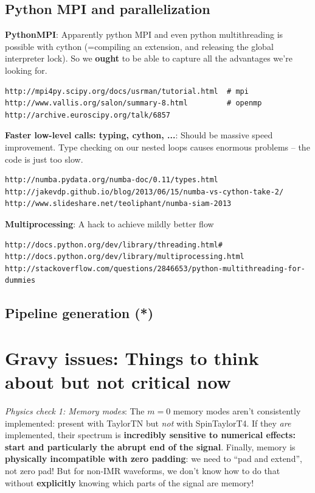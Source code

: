 \documentclass[twocolumn,prd,nofootinbib]{revtex4}
\begin{document}
\subsection{Python MPI and parallelization}

\noindent \textbf{PythonMPI}: Apparently python MPI and even python multithreading is possible with cython (=compiling an extension, and releasing the
global interpreter lock).  So we \textbf{ought} to be able to capture all the advantages we're looking for.
\begin{verbatim}
http://mpi4py.scipy.org/docs/usrman/tutorial.html  # mpi
http://www.vallis.org/salon/summary-8.html         # openmp
http://archive.euroscipy.org/talk/6857
\end{verbatim}

\noindent \textbf{Faster low-level calls: typing, cython, ...}: Should be massive speed improvement.  Type checking on
our nested loops causes enormous problems -- the code is just too slow.
\begin{verbatim}
http://numba.pydata.org/numba-doc/0.11/types.html
http://jakevdp.github.io/blog/2013/06/15/numba-vs-cython-take-2/
http://www.slideshare.net/teoliphant/numba-siam-2013
\end{verbatim}

\noindent \textbf{Multiprocessing}:  A hack to achieve mildly better flow
\begin{verbatim}
http://docs.python.org/dev/library/threading.html#	
http://docs.python.org/dev/library/multiprocessing.html
http://stackoverflow.com/questions/2846653/python-multithreading-for-dummies
\end{verbatim}

\subsection{Pipeline generation (*)}


\appendix



\section{Gravy issues: Things to think about but not critical now}

\emph{Physics check 1: Memory modes}: The $m=0$ memory modes \cite{2009PhRvD..80b4002F,2009ApJ...696L.159F,2010CQGra..27h4036F,2011PhRvD..84l4013F} aren't consistently implemented: present with
  TaylorTN but \emph{not} with SpinTaylorT4.   If they \emph{are}
  implemented, their spectrum is \textbf{incredibly sensitive to numerical effects: start and particularly the abrupt
    end of the signal}.  Finally, memory is \textbf{physically incompatible with zero padding}: we need to ``pad and
  extend'', not zero pad!    But for non-IMR waveforms, we don't know how to do that without \textbf{explicitly} knowing
  which parts of the signal are memory!
\end{document}
